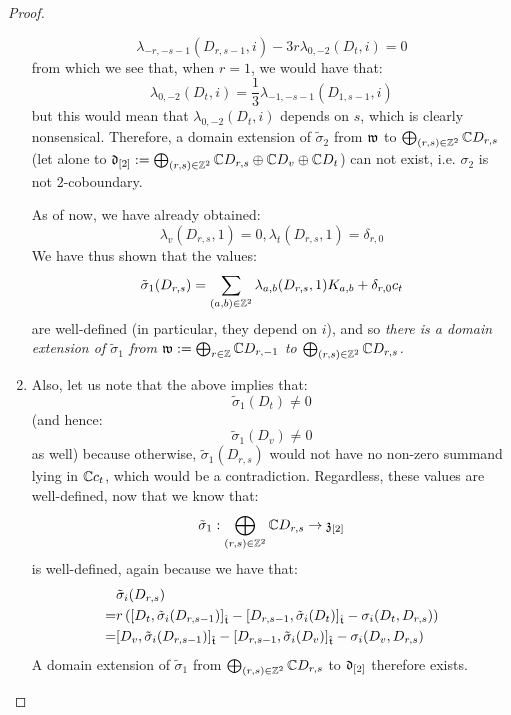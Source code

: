 \begin{proof}
\begin{enumerate}
                        $$\lambda_{-r, -s - 1}(D_{r, s - 1}, i) -3r\lambda_{0, -2}(D_t, i) = 0$$
                    from which we see that, when $r = 1$, we would have that:
                        $$\lambda_{0, -2}(D_t, i) = \frac13 \lambda_{-1, -s - 1}(D_{1, s - 1}, i)$$
                    but this would mean that $\lambda_{0, -2}(D_t, i)$ depends on $s$, which is clearly nonsensical. Therefore, a domain extension of $\tilde{\sigma}_2$ from $\mathfrak{w}$ to $\bigoplus_{(r, s) \in \mathbb{Z}^2} \mathbb{C} D_{r, s}$ (let alone to $\mathfrak{d}_{[2]} := \bigoplus_{(r, s) \in \mathbb{Z}^2} \mathbb{C} D_{r, s} \oplus \mathbb{C} D_v \oplus \mathbb{C} D_t$) can not exist, i.e. $\sigma_2$ is not $2$-coboundary.
                        
                    
                    As of now, we have already obtained:
                        $$\lambda_v(D_{r, s}, 1) = 0, \lambda_t(D_{r, s}, 1) = \delta_{r, 0}$$
                    We have thus shown that the values:
                        $$\tilde{\sigma}_1(D_{r, s}) = \sum_{(a, b) \in \mathbb{Z}^2} \lambda_{a, b}(D_{r, s}, 1) K_{a, b} + \delta_{r, 0} c_t$$
                    are well-defined (in particular, they depend on $i$), and so \textit{there is a domain extension of $\tilde{\sigma}_1$ from $\mathfrak{w} := \bigoplus_{r \in \mathbb{Z}} \mathbb{C} D_{r, -1}$ to $\bigoplus_{(r, s) \in \mathbb{Z}^2} \mathbb{C} D_{r, s}$.}
                    \item Also, let us note that the above implies that:
                        $$\tilde{\sigma}_1(D_t) \not = 0$$
                    (and hence:
                        $$\tilde{\sigma}_1(D_v) \not = 0$$
                    as well) because otherwise, $\tilde{\sigma}_1(D_{r, s})$ would not have no non-zero summand lying in $\mathbb{C} c_t$, which would be a contradiction. Regardless, these values are well-defined, now that we know that:
                        $$\tilde{\sigma}_1: \bigoplus_{(r, s) \in \mathbb{Z}^2} \mathbb{C} D_{r, s} \to \mathfrak{z}_{[2]}$$
                    is well-defined, again because we have that:
                        $$
                            \begin{aligned}
                                & \tilde{\sigma}_i(D_{r, s})
                                \\
                                = & r\left( [D_t, \tilde{\sigma}_i(D_{r, s - 1})]_{\hat{\mathfrak{t}}} - [D_{r, s - 1}, \tilde{\sigma}_i(D_t)]_{\hat{\mathfrak{t}}} - \sigma_i(D_t, D_{r, s}) \right)
                                \\
                                = & [D_v, \tilde{\sigma}_i(D_{r, s - 1})]_{\hat{\mathfrak{t}}} - [D_{r, s - 1}, \tilde{\sigma}_i(D_v)]_{\hat{\mathfrak{t}}} - \sigma_i(D_v, D_{r, s})
                            \end{aligned}
                        $$
                    A domain extension of $\tilde{\sigma}_1$ from $\bigoplus_{(r, s) \in \mathbb{Z}^2} \mathbb{C} D_{r, s}$ to $\mathfrak{d}_{[2]}$ therefore exists.
                \end{enumerate}
            \end{proof}